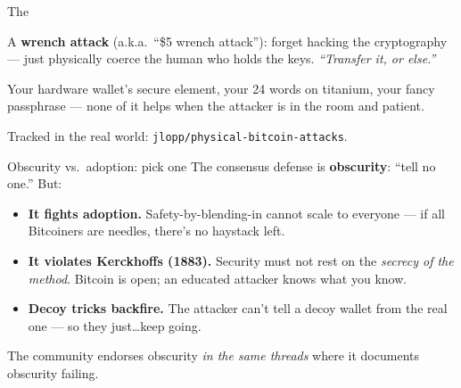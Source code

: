 \documentclass[aspectratio=169,11pt]{beamer}
\begin{document}
\begin{frame}{The \texorpdfstring{\wrench}{wrench attack}}
  \begin{keyidea}
    A \textbf{wrench attack} (a.k.a.\ ``\$5 wrench attack''): forget hacking the
    cryptography --- just physically coerce the human who holds the keys.
    \emph{``Transfer it, or else.''}
  \end{keyidea}
  \vspace{4pt}
  Your hardware wallet's secure element, your 24 words on titanium, your fancy
  passphrase --- none of it helps when the attacker is in the room and patient.
  \vspace{6pt}
  \begin{center}\small\color{graytext}
  Tracked in the real world: \texttt{jlopp/physical-bitcoin-attacks}.
  \end{center}
\end{frame}


\begin{frame}{Obscurity vs.\ adoption: pick one}
  The consensus defense is \textbf{obscurity}: ``tell no one.'' But:
  \begin{itemize}
    \item \textbf{It fights adoption.} Safety-by-blending-in cannot scale to
      everyone --- if all Bitcoiners are needles, there's no haystack left.
    \item \textbf{It violates Kerckhoffs (1883).} Security must not rest on the
      \emph{secrecy of the method}. Bitcoin is open; an educated attacker knows
      what you know.
    \item \textbf{Decoy tricks backfire.} The attacker can't tell a decoy wallet
      from the real one --- so they just\ldots keep going.
  \end{itemize}
  \vspace{4pt}
  \begin{block}{The community endorses obscurity \emph{in the same threads} where it documents obscurity failing.}
  \end{block}
\end{frame}
\end{document}
